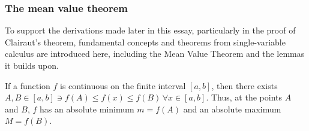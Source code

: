 \subsubsection{The mean value theorem}\label{section:MVT}
To support the derivations made later in this essay, particularly in the proof of Clairaut's theorem, fundamental
concepts and theorems from single-variable calculus are introduced here, including the Mean Value Theorem and the lemmas it builds upon.
\begin{lemma}\label{lemma:MINMAX}
	If a function $f$ is continuous on the finite interval $[a,b]$, then there exists $A,B\in[a,b]\ni f(A)\leq f(x)\leq f(B)\,\forall x\in[a,b]$.
	Thus, at the points $A$ and $B$, $f$ has an absolute minimum $m=f(A)$ and an absolute maximum $M=f(B)$.
\end{lemma}
